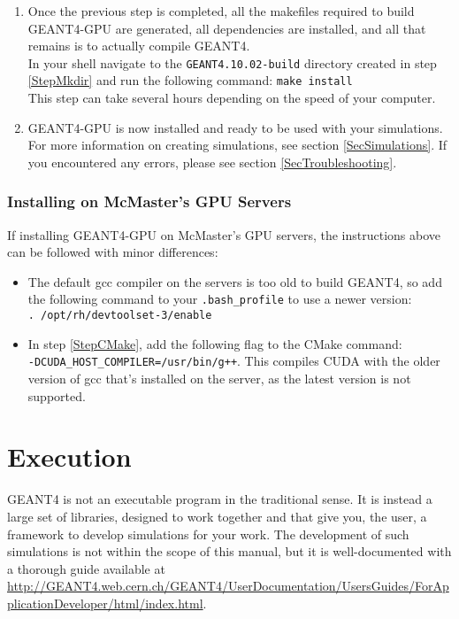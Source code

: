 \documentclass[12pt]{article}
\begin{document}
\begin{enumerate}
\item Once the previous step is completed, all the makefiles required to build GEANT4-GPU are generated, all dependencies are installed, and all that remains is to actually compile GEANT4.\\

In your shell navigate to the \texttt{GEANT4.10.02-build} directory created in step \ref{StepMkdir} and run the following command:
\texttt{make install}\\

This step can take several hours depending on the speed of your computer.
\item GEANT4-GPU is now installed and ready to be used with your simulations. For more information on creating simulations, see section \ref{SecSimulations}. If you encountered any errors, please see section \ref{SecTroubleshooting}.
\end{enumerate}

\subsubsection{Installing on McMaster's GPU Servers}\label{SecMac}
If installing GEANT4-GPU on McMaster's GPU servers, the instructions above can be followed with minor differences:
\begin{itemize}
\item The default gcc compiler on the servers is too old to build GEANT4, so add the following command to your \texttt{.bash\_profile} to use a newer version:\\
\texttt{. /opt/rh/devtoolset-3/enable}
\item In step \ref{StepCMake}, add the following flag to the CMake command:\\
\texttt{-DCUDA\_HOST\_COMPILER=/usr/bin/g++}. This compiles CUDA with the older version of gcc that's installed on the server, as the latest version is not supported.
\end{itemize}

\section{Execution} %
GEANT4 is not an executable program in the traditional sense. It is instead a large set of libraries, designed to work together and that give you, the user, a framework to develop simulations for your work. The development of such simulations is not within the scope of this manual, but it is well-documented with a thorough guide available at \url{http://GEANT4.web.cern.ch/GEANT4/UserDocumentation/UsersGuides/ForApplicationDeveloper/html/index.html}.\\
\end{document}
